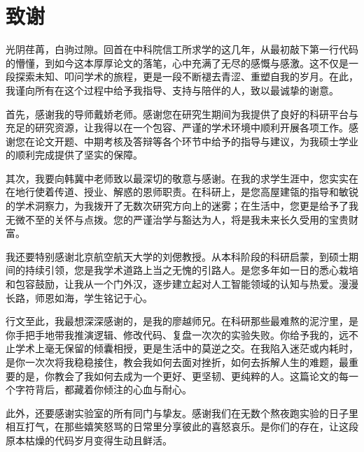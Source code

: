 \chapter[致谢]{致\quad 谢}%

光阴荏苒，白驹过隙。回首在中科院信工所求学的这几年，从最初敲下第一行代码的懵懂，到如今这本厚厚论文的落笔，心中充满了无尽的感慨与感激。这不仅是一段探索未知、叩问学术的旅程，更是一段不断褪去青涩、重塑自我的岁月。在此，我谨向所有在这个过程中给予我指导、支持与陪伴的人，致以最诚挚的谢意。

首先，感谢我的导师戴娇老师。感谢您在研究生期间为我提供了良好的科研平台与充足的研究资源，让我得以在一个包容、严谨的学术环境中顺利开展各项工作。感谢您在论文开题、中期考核及答辩等各个环节中给予的指导与建议，为我硕士学业的顺利完成提供了坚实的保障。

其次，我要向韩冀中老师致以最深切的敬意与感谢。在我的求学生涯中，您实实在在地行使着传道、授业、解惑的恩师职责。在科研上，是您高屋建瓴的指导和敏锐的学术洞察力，为我拨开了无数次研究方向上的迷雾；在生活中，您更是给予了我无微不至的关怀与点拨。您的严谨治学与豁达为人，将是我未来长久受用的宝贵财富。

我还要特别感谢北京航空航天大学的刘偲教授。从本科阶段的科研启蒙，到硕士期间的持续引领，您是我学术道路上当之无愧的引路人。是您多年如一日的悉心栽培和包容鼓励，让我从一个门外汉，逐步建立起对人工智能领域的认知与热爱。漫漫长路，师恩如海，学生铭记于心。

行文至此，我最想深深感谢的，是我的廖越师兄。在科研那些最难熬的泥泞里，是你手把手地带我推演逻辑、修改代码、复盘一次次的实验失败。你给予我的，远不止学术上毫无保留的倾囊相授，更是生活中的莫逆之交。在我陷入迷茫或内耗时，是你一次次将我稳稳接住，教会我如何去面对挫折，如何去拆解人生的难题，最重要的是，你教会了我如何去成为一个更好、更坚韧、更纯粹的人。这篇论文的每一个字符背后，都藏着你倾注的心血与耐心。

此外，还要感谢实验室的所有同门与挚友。感谢我们在无数个熬夜跑实验的日子里相互打气，在那些嬉笑怒骂的日常里分享彼此的喜怒哀乐。是你们的存在，让这段原本枯燥的代码岁月变得生动且鲜活。

